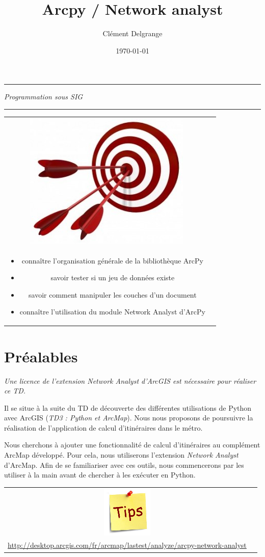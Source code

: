 \documentclass[11pt]{article}
\title{Arcpy / Network analyst}
\author{Clément Delgrange}
\date{\today}
\newenvironment{note}{%
	\begin{tabular}[t t]{c c}
		\includegraphics{img/tips.png}
		 &
		\begin{minipage}[c]{0.9\linewidth}
			\begin{sffamily}
}{%
			\end{sffamily}
		\end{minipage}
	\end{tabular}	
}
\newenvironment{objectifs}{
	\begin{lrbox}{\mybox}
		\begin{minipage}{0.9\textwidth}
			\vspace{1em}
			\begin{tabular}[t t]{c c}
				\includegraphics[width=0.1\linewidth]{img/goals.jpg} &
				\begin{minipage}[c]{0.8\linewidth}
					\hspace{2em}\textbf{\large{Objectifs :}} \\
}{
				\end{minipage}
			\end{tabular}
			\vspace{1em}
		\end{minipage}
	\end{lrbox}
	\fbox{\usebox{\mybox}}
}
\begin{document}
\parindent=0cm

\makeatletter
\begin{center}
	\hrule
	\vspace{1em}
	{\small \textit{Programmation sous SIG}}\\	
	\vspace{0.5em}
	{\Large \bfseries{\@title}}
	\vspace{1em}
	\hrule
\end{center}
\makeatother


\begin{objectifs}
\begin{itemize}
	\item connaître l'organisation générale de la bibliothèque ArcPy
	\item savoir tester si un jeu de données existe
	\item savoir comment manipuler les couches d'un document
	\item connaître l'utilisation du module Network Analyst d'ArcPy
\end{itemize}
\end{objectifs}


\section*{Préalables}
\textit{Une licence de l'extension Network Analyst d'ArcGIS est nécessaire pour réaliser ce TD.}

Il se situe à la suite du TD de découverte des différentes utilisations de Python avec ArcGIS (\textit{TD3 : Python et ArcMap}). Nous nous proposons de poursuivre la réalisation de l'application de calcul d'itinéraires dans le métro.

Nous cherchons à ajouter une fonctionnalité de calcul d'itinéraires au complément ArcMap développé. Pour cela, nous utiliserons l'extension \textit{Network Analyst} d'ArcMap. Afin de se familiariser avec ces outils, nous commencerons par les utiliser à la main avant de chercher à les exécuter en Python.

\begin{note}
Ressource utile : 
\begin{itemize}
	\item Doc Network Analyst : \\ 
	\url{http://desktop.arcgis.com/fr/arcmap/lastest/analyze/arcpy-network-analyst}
\end{itemize}
\end{note}
\end{document}
